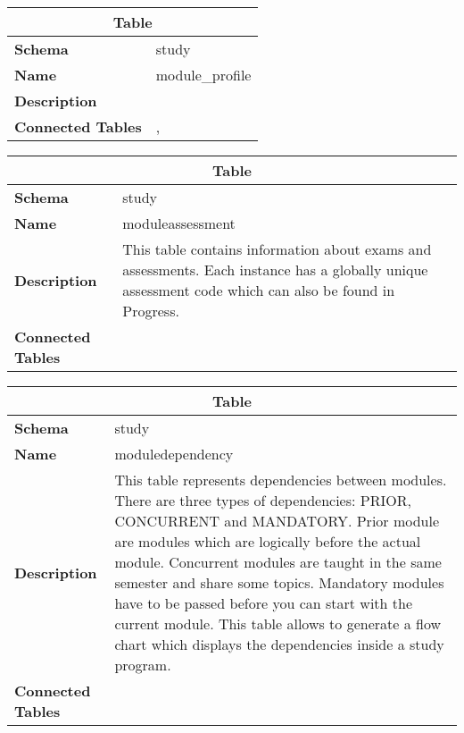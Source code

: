 \begin{table}[H]
	\label{table:module_profile}
	\centering
	\begin{tabular}{|p{}|p{}|}
		\hline
		\multicolumn{2}{|c|}{\textbf{Table}} \\ \hline
		\textbf{Schema}               & study \\ \hline
		\textbf{Name}                 & module\_profile \\ \hline
		\textbf{Description}          &      \\ \hline
		\textbf{Connected Tables}     & \tableref{module}, \tableref{profile} \\ \hline
	\end{tabular}
\end{table}

\begin{table}[H]
	\label{table:moduleassessment}
	\centering
	\begin{tabular}{|p{}|p{}|}
		\hline
		\multicolumn{2}{|c|}{\textbf{Table}} \\ \hline
		\textbf{Schema}               & study \\ \hline
		\textbf{Name}                 & moduleassessment \\ \hline
		\textbf{Description}          & This table contains information about exams and assessments. Each instance has a globally unique assessment code which can also be found in Progress. \\ \hline
		\textbf{Connected Tables}     & \tableref{module} \\ \hline
	\end{tabular}
\end{table}

\begin{table}[H]
	\label{table:moduledependency}
	\centering
	\begin{tabular}{|p{}|p{}|}
		\hline
		\multicolumn{2}{|c|}{\textbf{Table}} \\ \hline
		\textbf{Schema}               & study \\ \hline
		\textbf{Name}                 & moduledependency \\ \hline
		\textbf{Description}          & This table represents dependencies between modules. There are three types of dependencies: PRIOR, CONCURRENT and MANDATORY. Prior module are modules which are logically before the actual module. Concurrent modules are taught in the same semester and share some topics. Mandatory modules have to be passed before you can start with the current module. This table allows to generate a flow chart which displays the dependencies inside a study program. \\ \hline
		\textbf{Connected Tables}     & \tableref{module} \\ \hline
	\end{tabular}
\end{table}

